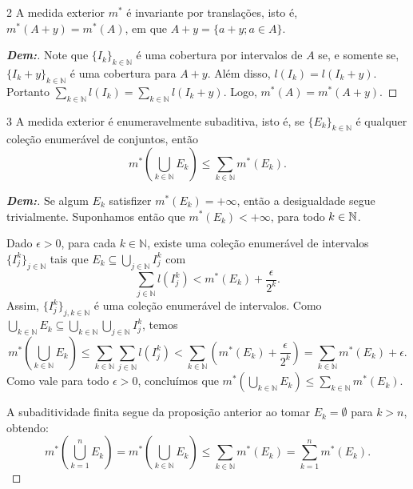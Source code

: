 \begin{prop*}{2}
A medida exterior $m^*$ é invariante por translações, isto é, $m^*(A+y) = m^*(A)$, em que $A+y = \{a+y ; a \in A\}$.
\end{prop*}

\begin{proof}[\textbf{Dem:}]
Note que $\{I_k\}_{k \in \mathbb{N}}$ é uma cobertura por intervalos de $A$ se, e somente se, $\{I_k+y\}_{k \in \mathbb{N}}$ é uma cobertura para $A+y$.
Além disso, $l(I_k) = l(I_k+y)$. Portanto $\sum_{k \in \mathbb{N}} l(I_k) = \sum_{k \in \mathbb{N}} l(I_k+y)$. Logo, $m^*(A) = m^*(A+y)$.
\end{proof}

\begin{prop*}{3}
A medida exterior é enumeravelmente subaditiva, isto é, se $\{E_k\}_{k \in \mathbb{N}}$ é qualquer coleção enumerável de conjuntos, então
$$ m^*\left(\bigcup_{k \in \mathbb{N}} E_k\right) \le \sum_{k \in \mathbb{N}} m^*(E_k). $$
\end{prop*}

\begin{proof}[\textbf{Dem:}]
Se algum $E_k$ satisfizer $m^*(E_k) = +\infty$, então a desigualdade segue trivialmente. Suponhamos então que $m^*(E_k) < +\infty$, para todo $k \in \mathbb N$. 

Dado $\epsilon > 0$, para cada $k \in \mathbb{N}$, existe uma coleção enumerável de intervalos $\{I_j^k\}_{j \in \mathbb{N}}$ tais que $E_k \subseteq \bigcup_{j \in \mathbb{N}} I_j^k$ com
  $$ \sum_{j \in \mathbb{N}} l(I_j^k) < m^*(E_k) + \frac{\epsilon}{2^k}. $$
Assim, $\{I_j^k\}_{j,k \in \mathbb{N}}$ é uma coleção enumerável de intervalos. Como $\bigcup_{k \in \mathbb{N}} E_k \subseteq \bigcup_{k \in \mathbb{N}} \bigcup_{j \in \mathbb{N}} I_j^k$, temos
$$ m^*\left(\bigcup_{k \in \mathbb{N}} E_k\right) \le \sum_{k \in \mathbb{N}} \sum_{j \in \mathbb{N}} l(I_j^k) < \sum_{k \in \mathbb{N}} \left(m^*(E_k) + \frac{\epsilon}{2^k}\right) = \sum_{k \in \mathbb{N}} m^*(E_k) + \epsilon. $$
Como vale para todo $\epsilon > 0$, concluímos que $m^*\left(\bigcup_{k \in \mathbb{N}} E_k\right) \le \sum_{k \in \mathbb{N}} m^*(E_k)$.

A subaditividade finita segue da proposição anterior ao tomar $E_k = \emptyset$ para $k > n$, obtendo:
$$ m^*\left(\bigcup_{k=1}^n E_k\right) = m^*\left(\bigcup_{k \in \mathbb{N}} E_k\right) \le \sum_{k \in \mathbb{N}} m^*(E_k) = \sum_{k=1}^n m^*(E_k). $$
\end{proof}


